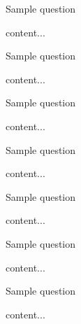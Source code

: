 \documentclass[11pt]{article} %
\begin{document}
	\renewcommand*{\CourseCodeAN}{CLASS 000 - Assignment\#0} %
	\renewcommand*{\AssignmentDate}{00 MONTH 2018} %
	
	\pagestyle{Assignment}
	\fancyhfoffset[E,O]{0pt} %
	
	\begin{qstn}[\theQnum][][10] %
		Sample question
	\begin{soln}
		content...
	\end{soln}
	\end{qstn}
	
	\begin{qstn}[\theQnum][][10]
		Sample question
	\begin{soln}
		content...
	\end{soln}
	\end{qstn}
	
	\begin{qstn}[\theQnum][][10]
		Sample question
	\begin{soln}
		content...
	\end{soln}
	\end{qstn}
	
	\begin{qstn}[\theQnum][][10]
		Sample question
	\begin{soln}
		content...
	\end{soln}
	\end{qstn}
	
	\begin{qstn}[\theQnum][][10]
		Sample question
	\begin{soln}
		content...
	\end{soln}
	\end{qstn}
	
	\begin{qstn}[\theQnum][][10]
		Sample question
	\begin{soln}
		content...
	\end{soln}
	\end{qstn}
	
	\begin{qstn}[\theQnum][][10]
		Sample question
	\begin{soln}
		content...
	\end{soln}
	\end{qstn}
	
\end{document}
